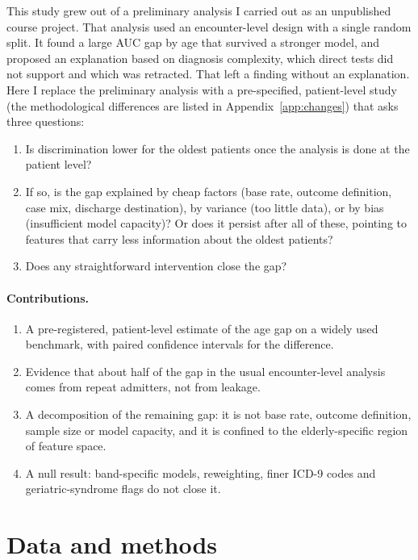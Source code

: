 \documentclass{article}
\begin{document}
This study grew out of a preliminary analysis I carried out as an unpublished course project. That analysis used an encounter-level design with a single random split. It found a large AUC gap by age that survived a stronger model, and proposed an explanation based on diagnosis complexity, which direct tests did not support and which was retracted. That left a finding without an explanation. Here I replace the preliminary analysis with a pre-specified, patient-level study (the methodological differences are listed in Appendix~\ref{app:changes}) that asks three questions:
\begin{enumerate}
  \item Is discrimination lower for the oldest patients once the analysis is done at the patient level?
  \item If so, is the gap explained by cheap factors (base rate, outcome definition, case mix, discharge destination), by variance (too little data), or by bias (insufficient model capacity)? Or does it persist after all of these, pointing to features that carry less information about the oldest patients?
  \item Does any straightforward intervention close the gap?
\end{enumerate}

\paragraph{Contributions.}
\begin{enumerate}
  \item A pre-registered, patient-level estimate of the age gap on a widely used benchmark, with paired confidence intervals for the difference.
  \item Evidence that about half of the gap in the usual encounter-level analysis comes from repeat admitters, not from leakage.
  \item A decomposition of the remaining gap: it is not base rate, outcome definition, sample size or model capacity, and it is confined to the elderly-specific region of feature space.
  \item A null result: band-specific models, reweighting, finer ICD-9 codes and geriatric-syndrome flags do not close it.
\end{enumerate}

\section{Data and methods}
\end{document}
